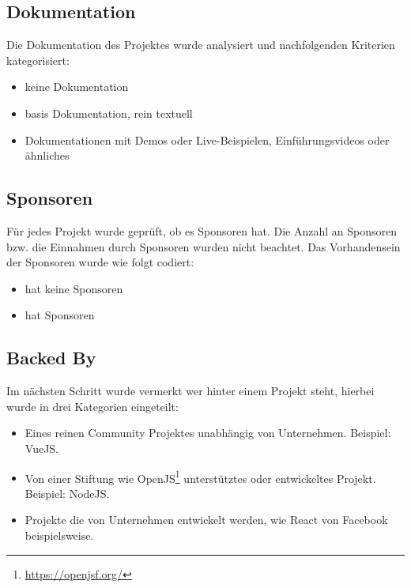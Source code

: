 \subsection{Dokumentation} \label{ssec:manuelle_datenerfassung_dokumentation}
Die Dokumentation des Projektes wurde analysiert und nachfolgenden Kriterien kategorisiert:

\begin{itemize}[noitemsep]
    \item[0 =] keine Dokumentation
    \item[1 =] basis Dokumentation, rein textuell
    \item[2 =] Dokumentationen mit Demos oder Live-Beispielen,
        Einführungsvideos oder ähnliches
\end{itemize}


\subsection{Sponsoren}
Für jedes Projekt wurde geprüft, ob es Sponsoren hat. Die Anzahl an Sponsoren bzw. die Einnahmen
durch Sponsoren wurden nicht beachtet. Das Vorhandensein der Sponsoren wurde wie folgt codiert:

\begin{itemize}[noitemsep]
    \item[0 =] hat keine Sponsoren
    \item[1 =] hat Sponsoren
\end{itemize}


\subsection{Backed By} %


Im nächsten Schritt wurde vermerkt wer hinter einem Projekt steht, hierbei wurde in drei Kategorien
eingeteilt:

\begin{itemize}[noitemsep]
    \item[0 =] Eines reinen Community Projektes unabhängig von Unternehmen. Beispiel: VueJS.
    \item[1 =] Von einer Stiftung wie OpenJS\footnote{\url{https://openjsf.org/}} unterstütztes oder
        entwickeltes Projekt.\\ Beispiel: NodeJS.
    \item[2 =] Projekte die von Unternehmen entwickelt werden, wie React von Facebook beispielsweise.
\end{itemize}


